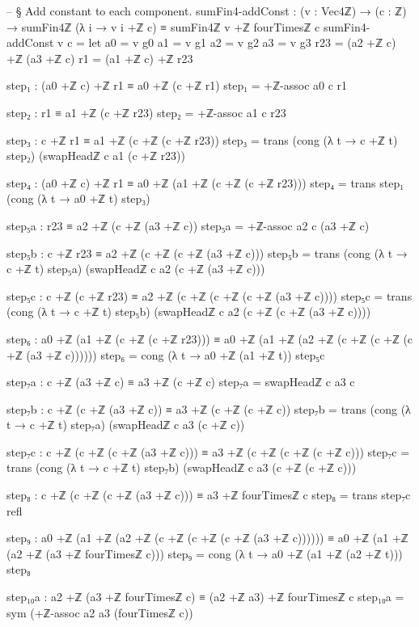 \documentclass[11pt,a4paper]{book}
\begin{document}
\begin{code}
-- § Add constant to each component.
sumFin4-addConst : (v : Vec4ℤ) → (c : ℤ) →
  sumFin4ℤ (λ i → v i +ℤ c) ≡ sumFin4ℤ v +ℤ fourTimesℤ c
sumFin4-addConst v c =
  let
    a0 = v g0
    a1 = v g1
    a2 = v g2
    a3 = v g3
    r23 = (a2 +ℤ c) +ℤ (a3 +ℤ c)
    r1  = (a1 +ℤ c) +ℤ r23

    step₁ : (a0 +ℤ c) +ℤ r1 ≡ a0 +ℤ (c +ℤ r1)
    step₁ = +ℤ-assoc a0 c r1

    step₂ : r1 ≡ a1 +ℤ (c +ℤ r23)
    step₂ = +ℤ-assoc a1 c r23

    step₃ : c +ℤ r1 ≡ a1 +ℤ (c +ℤ (c +ℤ r23))
    step₃ =
      trans
        (cong (λ t → c +ℤ t) step₂)
        (swapHeadℤ c a1 (c +ℤ r23))

    step₄ : (a0 +ℤ c) +ℤ r1 ≡ a0 +ℤ (a1 +ℤ (c +ℤ (c +ℤ r23)))
    step₄ = trans step₁ (cong (λ t → a0 +ℤ t) step₃)

    step₅a : r23 ≡ a2 +ℤ (c +ℤ (a3 +ℤ c))
    step₅a = +ℤ-assoc a2 c (a3 +ℤ c)

    step₅b : c +ℤ r23 ≡ a2 +ℤ (c +ℤ (c +ℤ (a3 +ℤ c)))
    step₅b =
      trans
        (cong (λ t → c +ℤ t) step₅a)
        (swapHeadℤ c a2 (c +ℤ (a3 +ℤ c)))

    step₅c : c +ℤ (c +ℤ r23) ≡ a2 +ℤ (c +ℤ (c +ℤ (c +ℤ (a3 +ℤ c))))
    step₅c =
      trans
        (cong (λ t → c +ℤ t) step₅b)
        (swapHeadℤ c a2 (c +ℤ (c +ℤ (a3 +ℤ c))))

    step₆ : a0 +ℤ (a1 +ℤ (c +ℤ (c +ℤ r23))) ≡ a0 +ℤ (a1 +ℤ (a2 +ℤ (c +ℤ (c +ℤ (c +ℤ (a3 +ℤ c))))))
    step₆ = cong (λ t → a0 +ℤ (a1 +ℤ t)) step₅c

    step₇a : c +ℤ (a3 +ℤ c) ≡ a3 +ℤ (c +ℤ c)
    step₇a = swapHeadℤ c a3 c

    step₇b : c +ℤ (c +ℤ (a3 +ℤ c)) ≡ a3 +ℤ (c +ℤ (c +ℤ c))
    step₇b =
      trans
        (cong (λ t → c +ℤ t) step₇a)
        (swapHeadℤ c a3 (c +ℤ c))

    step₇c : c +ℤ (c +ℤ (c +ℤ (a3 +ℤ c))) ≡ a3 +ℤ (c +ℤ (c +ℤ (c +ℤ c)))
    step₇c =
      trans
        (cong (λ t → c +ℤ t) step₇b)
        (swapHeadℤ c a3 (c +ℤ (c +ℤ c)))

    step₈ : c +ℤ (c +ℤ (c +ℤ (a3 +ℤ c))) ≡ a3 +ℤ fourTimesℤ c
    step₈ = trans step₇c refl

    step₉ : a0 +ℤ (a1 +ℤ (a2 +ℤ (c +ℤ (c +ℤ (c +ℤ (a3 +ℤ c)))))) ≡ a0 +ℤ (a1 +ℤ (a2 +ℤ (a3 +ℤ fourTimesℤ c)))
    step₉ = cong (λ t → a0 +ℤ (a1 +ℤ (a2 +ℤ t))) step₈

    step₁₀a : a2 +ℤ (a3 +ℤ fourTimesℤ c) ≡ (a2 +ℤ a3) +ℤ fourTimesℤ c
    step₁₀a = sym (+ℤ-assoc a2 a3 (fourTimesℤ c))


\end{code}
\end{document}
